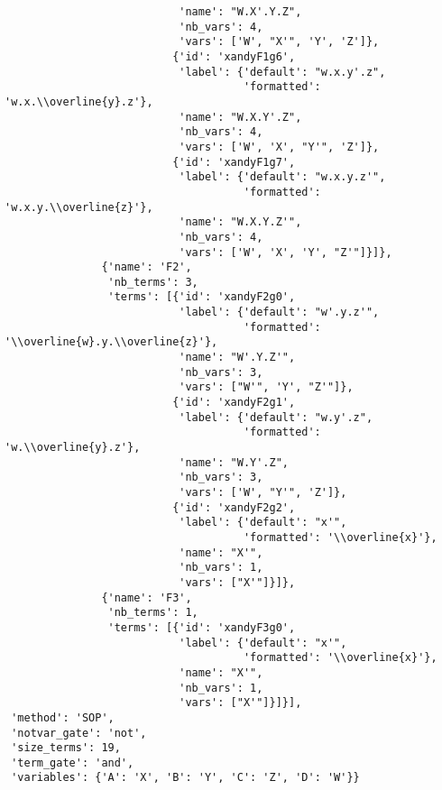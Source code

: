 \begin{verbatim}
                           'name': "W.X'.Y.Z",
                           'nb_vars': 4,
                           'vars': ['W', "X'", 'Y', 'Z']},
                          {'id': 'xandyF1g6',
                           'label': {'default': "w.x.y'.z",
                                     'formatted': 'w.x.\\overline{y}.z'},
                           'name': "W.X.Y'.Z",
                           'nb_vars': 4,
                           'vars': ['W', 'X', "Y'", 'Z']},
                          {'id': 'xandyF1g7',
                           'label': {'default': "w.x.y.z'",
                                     'formatted': 'w.x.y.\\overline{z}'},
                           'name': "W.X.Y.Z'",
                           'nb_vars': 4,
                           'vars': ['W', 'X', 'Y', "Z'"]}]},
               {'name': 'F2',
                'nb_terms': 3,
                'terms': [{'id': 'xandyF2g0',
                           'label': {'default': "w'.y.z'",
                                     'formatted': '\\overline{w}.y.\\overline{z}'},
                           'name': "W'.Y.Z'",
                           'nb_vars': 3,
                           'vars': ["W'", 'Y', "Z'"]},
                          {'id': 'xandyF2g1',
                           'label': {'default': "w.y'.z",
                                     'formatted': 'w.\\overline{y}.z'},
                           'name': "W.Y'.Z",
                           'nb_vars': 3,
                           'vars': ['W', "Y'", 'Z']},
                          {'id': 'xandyF2g2',
                           'label': {'default': "x'",
                                     'formatted': '\\overline{x}'},
                           'name': "X'",
                           'nb_vars': 1,
                           'vars': ["X'"]}]},
               {'name': 'F3',
                'nb_terms': 1,
                'terms': [{'id': 'xandyF3g0',
                           'label': {'default': "x'",
                                     'formatted': '\\overline{x}'},
                           'name': "X'",
                           'nb_vars': 1,
                           'vars': ["X'"]}]}],
 'method': 'SOP',
 'notvar_gate': 'not',
 'size_terms': 19,
 'term_gate': 'and',
 'variables': {'A': 'X', 'B': 'Y', 'C': 'Z', 'D': 'W'}}
\end{verbatim}






